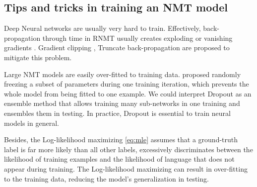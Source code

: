 \subsection{Tips and tricks in training an NMT model}
Deep Neural networks are usually very hard to train. Effectively, back-propagation through time in RNMT usually creates exploding or vanishing gradients \citep{Pascanu13onthe,Glorot10understanding}. Gradient clipping \citep{Pascanu13onthe}, Truncate back-propagation \citep{Jaeger02tutorial} are proposed to mitigate this problem.

Large NMT models are easily over-fitted to training data. \citet{Srivastava14Dropout} proposed randomly freezing a subset of parameters during one training iteration, which prevents the whole model from being fitted to one example. We could interpret Dropout as an ensemble method that allows training many sub-networks in one training and ensembles them in testing. In practice, Dropout is essential to train neural models in general. 

Besides, the Log-likelihood maximizing \eqref{eq:mle} assumes that a ground-truth label is far more likely than all other labels, excessively discriminates between the likelihood of training examples and the likelihood of language that does not appear during training. The Log-likelihood maximizing can result in over-fitting to the training data, reducing the model's generalization in testing.

